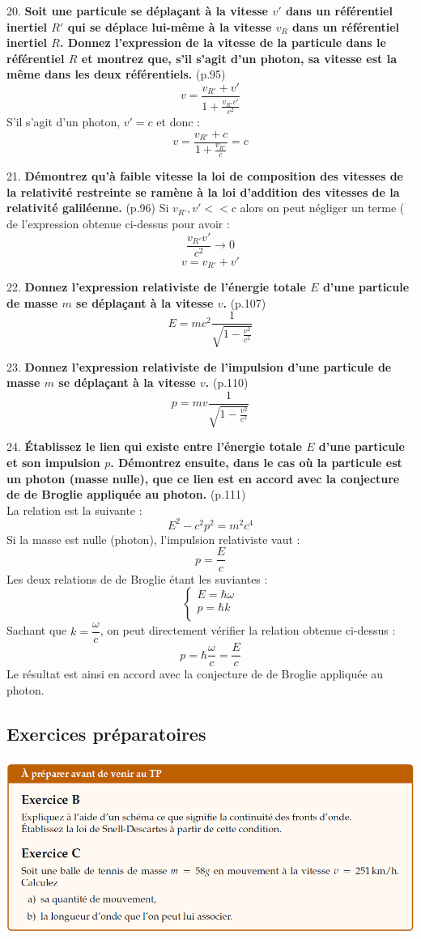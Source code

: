\documentclass	[11pt, a4paper, openany]{book}
\newcommand{\questpm}[3]{#1. \textbf{#3} (p.#2)}
\begin{document}
\questpm{20}{95}{Soit une particule se déplaçant à la vitesse $v'$ dans un référentiel inertiel $R'$ qui se déplace lui-même à la vitesse $v_R$ dans un référentiel inertiel $R$. Donnez l’expression de la vitesse de la particule dans le référentiel $R$ et montrez que, s’il s’agit d’un photon, sa vitesse est la même dans les deux référentiels.}
$$v = \frac{v_{R'} + v'}{1 + \frac{v_{R'}v'}{c^2}}$$
S'il s'agit d'un photon, $v' = c$ et donc : 
$$v = \frac{v_{R'} + c}{1 + \frac{v_{R'}}{c}} = c$$

\questpm{21}{96}{Démontrez qu’à faible vitesse la loi de composition des vitesses de la relativité restreinte se ramène à la loi d’addition des vitesses de la relativité galiléenne.}
Si $v_{R'}, v' << c$ alors on peut négliger un terme ( de l'expression obtenue ci-dessus pour avoir : 
$$\frac{v_{R'}v'}{c^2} \rightarrow 0$$
$$v = v_{R'} + v'$$

\questpm{22}{107}{Donnez l’expression relativiste de l’énergie totale $E$ d’une particule de masse $m$ se déplaçant à la vitesse $v$.}
$$E = mc^2 \frac{1}{\sqrt{1 - \frac{v^2}{c^2}}}$$

\questpm{23}{110}{Donnez l’expression relativiste de l’impulsion d’une particule de masse $m$ se déplaçant à la
vitesse $v$.}
$$p = mv \frac{1}{\sqrt{1 - \frac{v^2}{c^2}}}$$

\questpm{24}{111}{Établissez le lien qui existe entre l’énergie totale $E$ d’une particule et son impulsion $p$. Démontrez ensuite, dans le cas où la particule est un photon (masse nulle), que ce lien est en accord avec la conjecture de de Broglie appliquée au photon.}
\ \\ La relation est la suivante : 
$$E^2 - c^2 p^2 = m^2 c^4$$
Si la masse est nulle (photon), l'impulsion relativiste vaut : 
$$p = \frac{E}{c}$$
Les deux relations de de Broglie étant les suviantes : 
$$\left\{\begin{array}{l}
E = \hbar\omega \\
p = \hbar k\\
\end{array}\right.$$
Sachant que $k = \dfrac{\omega}{c}$, on peut directement vérifier la relation obtenue ci-dessus :
$$p = \hbar \frac{\omega}{c} = \frac{E}{c}$$
Le résultat est ainsi en accord avec la conjecture de de Broglie appliquée au photon.


\newpage
\subsection{Exercices préparatoires}
\begin{center}
\includegraphics[scale=0.60]{prepa/physmB.png}\\
\end{center}
\end{document}
